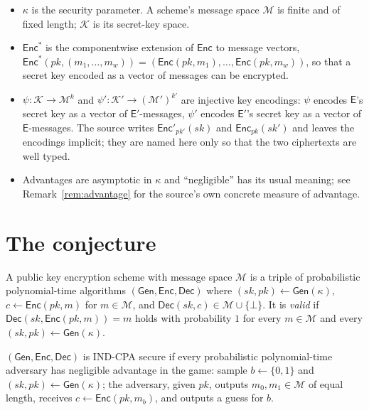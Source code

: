 \documentclass{conjura-conjecture}
\newcommand{\Gen}{\mathsf{Gen}}
\newcommand{\Enc}{\mathsf{Enc}}
\newcommand{\Dec}{\mathsf{Dec}}
\newcommand{\Msp}{\mathcal{M}}
\newcommand{\Ksp}{\mathcal{K}}
\newcommand{\secpar}{\kappa}
\begin{document}
\begin{itemize}
\item $\secpar$ is the security parameter. A scheme's message space
  $\Msp$ is finite and of fixed length; $\Ksp$ is its secret-key space.
\item $\Enc^{*}$ is the componentwise extension of $\Enc$ to message
  vectors, $\Enc^{*}(pk, (m_{1}, \dots, m_{w})) = (\Enc(pk, m_{1}),
  \dots, \Enc(pk, m_{w}))$, so that a secret key encoded as a vector of
  messages can be encrypted.
\item $\psi : \Ksp \to \Msp^{k}$ and $\psi' : \Ksp' \to (\Msp')^{k'}$
  are injective key encodings: $\psi$ encodes $\mathsf{E}$'s secret key
  as a vector of $\mathsf{E}'$-messages, $\psi'$ encodes $\mathsf{E}'$'s
  secret key as a vector of $\mathsf{E}$-messages. The source writes
  $\Enc'_{pk'}(sk)$ and $\Enc_{pk}(sk')$ and leaves the encodings
  implicit; they are named here only so that the two ciphertexts are
  well typed.
\item Advantages are asymptotic in $\secpar$ and ``negligible'' has its
  usual meaning; see Remark~\ref{rem:advantage} for the source's own
  concrete measure of advantage.
\end{itemize}

\section{The conjecture}\label{sec:conjectures}

\begin{definition}\label{def:scheme}
A public key encryption scheme with message space $\Msp$ is a triple of
probabilistic polynomial-time algorithms $(\Gen, \Enc, \Dec)$ where
$(sk, pk) \gets \Gen(\secpar)$, $c \gets \Enc(pk, m)$ for $m \in \Msp$,
and $\Dec(sk, c) \in \Msp \cup \{\bot\}$. It is \emph{valid} if
$\Dec(sk, \Enc(pk, m)) = m$ holds with probability $1$ for every $m \in
\Msp$ and every $(sk, pk) \gets \Gen(\secpar)$.
\end{definition}

\begin{definition}\label{def:indcpa}
$(\Gen, \Enc, \Dec)$ is IND-CPA secure if every probabilistic
polynomial-time adversary has negligible advantage in the game: sample
$b \gets \{0,1\}$ and $(sk, pk) \gets \Gen(\secpar)$; the adversary,
given $pk$, outputs $m_{0}, m_{1} \in \Msp$ of equal length, receives
$c \gets \Enc(pk, m_{b})$, and outputs a guess for $b$.
\end{definition}
\end{document}
